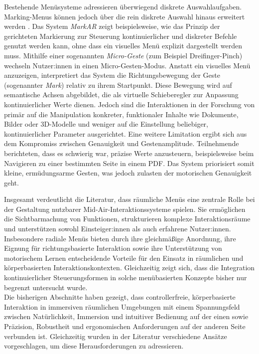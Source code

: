Bestehende Menüsysteme adressieren überwiegend diskrete Auswahlaufgaben. Marking-Menus können jedoch über die rein diskrete Auswahl hinaus erweitert werden \parencite{baillyPometti2024MarkARExploringTheBenefitsOfCombiningMicrogesturesAndMidAirMarksToTriggerCommandsInAR}. Das System \textit{MarkAR} zeigt beispielsweise, wie das Prinzip der gerichteten Markierung zur Steuerung kontinuierlicher und diskreter Befehle genutzt werden kann, ohne dass ein visuelles Menü explizit dargestellt werden muss. Mithilfe einer sogenannten \textit{Micro-Geste} (zum Beispiel Dreifinger-Pinch) wechseln Nutzer:innen  in einen Micro-Gesten-Modus. Anstatt ein visuelles Menü anzuzeigen, interpretiert das System die Richtungsbewegung der Geste (sogenannter \textit{Mark}) relativ zu ihrem Startpunkt. Diese Bewegung wird auf semantische Achsen abgebildet, die als virtuelle Schieberegler zur Anpassung kontinuierlicher Werte dienen. Jedoch sind die Interaktionen in der Forschung von \textcite{baillyPometti2024MarkARExploringTheBenefitsOfCombiningMicrogesturesAndMidAirMarksToTriggerCommandsInAR} primär auf die Manipulation konkreter, funktionaler Inhalte wie Dokumente, Bilder oder 3D-Modelle und weniger auf die Einstellung beliebiger, kontinuierlicher Parameter ausgerichtet. Eine weitere Limitation ergibt sich aus dem Kompromiss zwischen Genauigkeit und Gestenamplitude. Teilnehmende berichteten, dass es schwierig war, präzise Werte anzusteuern, beispielsweise beim Navigieren zu einer bestimmten Seite in einem PDF. Das System priorisiert somit kleine, ermüdungsarme Gesten, was jedoch zulasten der motorischen Genauigkeit geht.

Insgesamt verdeutlicht die Literatur, dass räumliche Menüs eine zentrale Rolle bei der Gestaltung nutzbarer Mid-Air-Interaktionssysteme spielen. Sie ermög\-lichen die Sichtbarmachung von Funktionen, strukturieren komplexe Interaktionsräume und unterstützen sowohl Einsteiger:innen als auch erfahrene Nutzer:innen. Insbesondere radiale Menüs bieten durch ihre gleichmäßige Anordnung, ihre Eignung für richtungsbasierte Interaktion sowie ihre Unterstützung von motorischem Lernen entscheidende Vorteile für den Einsatz in räumlichen und körper\-basierten Interaktionskontexten. Gleichzeitig zeigt sich, dass die Integration kontinuierlicher Steuerungsformen in solche menübasierten Konzepte bisher nur begrenzt untersucht wurde. \\

Die bisherigen Abschnitte haben gezeigt, dass controllerfreie, körperbasierte Interaktion in immersiven räumlichen Umgebungen mit einem Spannungsfeld zwischen Natürlichkeit, Immersion und intuitiver Bedienung auf der einen sowie Präzision, Robustheit und ergonomischen Anforderungen auf der anderen Seite verbunden ist. Gleichzeitig wurden in der Literatur verschiedene Ansätze vorgeschlagen, um diese Herausforderungen zu adressieren.

